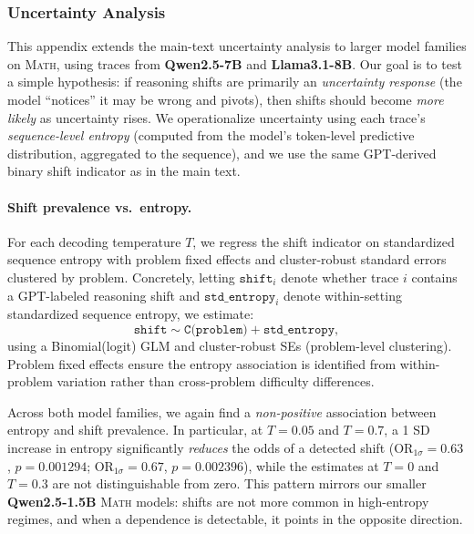 \subsubsection{Uncertainty Analysis}
\label{app:uncertainty-analysis}

This appendix extends the main-text uncertainty analysis to larger model families on \textsc{Math}, using traces from \textbf{Qwen2.5-7B} and \textbf{Llama3.1-8B}. Our goal is to test a simple hypothesis: if reasoning shifts are primarily an \emph{uncertainty response} (the model ``notices'' it may be wrong and pivots), then shifts should become \emph{more likely} as uncertainty rises. We operationalize uncertainty using each trace's \emph{sequence-level entropy} (computed from the model's token-level predictive distribution, aggregated to the sequence), and we use the same GPT-derived binary shift indicator as in the main text.

\paragraph{Shift prevalence vs.\ entropy.}
For each decoding temperature $T$, we regress the shift indicator on standardized sequence entropy with problem fixed effects and cluster-robust standard errors clustered by problem. Concretely, letting $\texttt{shift}_{i}$ denote whether trace $i$ contains a GPT-labeled reasoning shift and $\texttt{std\_entropy}_{i}$ denote within-setting standardized sequence entropy, we estimate:
\[
\texttt{shift} \sim \texttt{C(problem)} + \texttt{std\_entropy},
\]
using a Binomial(logit) GLM and cluster-robust SEs (problem-level clustering). Problem fixed effects ensure the entropy association is identified from within-problem variation rather than cross-problem difficulty differences.

Across both model families, we again find a \emph{non-positive} association between entropy and shift prevalence. In particular, at $T{=}0.05$ and $T{=}0.7$, a 1 SD increase in entropy significantly \emph{reduces} the odds of a detected shift (OR$_{1\sigma}{=}0.63$, $p=0.001294$; OR$_{1\sigma}{=}0.67$, $p=0.002396$), while the estimates at $T{=}0$ and $T{=}0.3$ are not distinguishable from zero. This pattern mirrors our smaller \textbf{Qwen2.5-1.5B} \textsc{Math} models: shifts are not more common in high-entropy regimes, and when a dependence is detectable, it points in the opposite direction.

